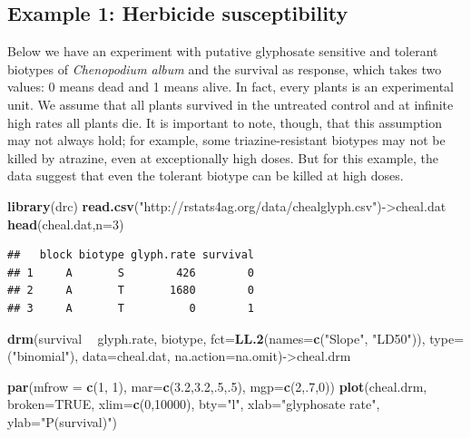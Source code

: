 \documentclass[letterpaper,]{book}
\newenvironment{Shaded}{\begin{snugshade}}{\end{snugshade}}
\newcommand{\DataTypeTok}[1]{\textcolor[rgb]{0.13,0.29,0.53}{#1}}
\newcommand{\DecValTok}[1]{\textcolor[rgb]{0.00,0.00,0.81}{#1}}
\newcommand{\FloatTok}[1]{\textcolor[rgb]{0.00,0.00,0.81}{#1}}
\newcommand{\KeywordTok}[1]{\textcolor[rgb]{0.13,0.29,0.53}{\textbf{#1}}}
\newcommand{\NormalTok}[1]{#1}
\newcommand{\OperatorTok}[1]{\textcolor[rgb]{0.81,0.36,0.00}{\textbf{#1}}}
\newcommand{\OtherTok}[1]{\textcolor[rgb]{0.56,0.35,0.01}{#1}}
\newcommand{\StringTok}[1]{\textcolor[rgb]{0.31,0.60,0.02}{#1}}
\begin{document}
\hypertarget{example-1-herbicide-susceptibility}{%
\subsection{Example 1: Herbicide susceptibility}\label{example-1-herbicide-susceptibility}}

Below we have an experiment with putative glyphosate sensitive and tolerant biotypes of \emph{Chenopodium album} and the survival as response, which takes two values: 0 means dead and 1 means alive. In fact, every plants is an experimental unit. We assume that all plants survived in the untreated control and at infinite high rates all plants die. It is important to note, though, that this assumption may not always hold; for example, some triazine-resistant biotypes may not be killed by atrazine, even at exceptionally high doses. But for this example, the data suggest that even the tolerant biotype can be killed at high doses.



\begin{Shaded}
\begin{Highlighting}[]
\KeywordTok{library}\NormalTok{(drc)}
\KeywordTok{read.csv}\NormalTok{(}\StringTok{"http://rstats4ag.org/data/chealglyph.csv"}\NormalTok{)->cheal.dat}
\KeywordTok{head}\NormalTok{(cheal.dat,}\DataTypeTok{n=}\DecValTok{3}\NormalTok{)}
\end{Highlighting}
\end{Shaded}

\begin{verbatim}
##   block biotype glyph.rate survival
## 1     A       S        426        0
## 2     A       T       1680        0
## 3     A       T          0        1
\end{verbatim}

\begin{Shaded}
\begin{Highlighting}[]
\KeywordTok{drm}\NormalTok{(survival }\OperatorTok{~}\StringTok{ }\NormalTok{glyph.rate, biotype, }\DataTypeTok{fct=}\KeywordTok{LL.2}\NormalTok{(}\DataTypeTok{names=}\KeywordTok{c}\NormalTok{(}\StringTok{"Slope"}\NormalTok{, }\StringTok{"LD50"}\NormalTok{)),}
    \DataTypeTok{type=}\NormalTok{(}\StringTok{"binomial"}\NormalTok{), }\DataTypeTok{data=}\NormalTok{cheal.dat, }\DataTypeTok{na.action=}\NormalTok{na.omit)->cheal.drm}

\KeywordTok{par}\NormalTok{(}\DataTypeTok{mfrow =} \KeywordTok{c}\NormalTok{(}\DecValTok{1}\NormalTok{, }\DecValTok{1}\NormalTok{), }\DataTypeTok{mar=}\KeywordTok{c}\NormalTok{(}\FloatTok{3.2}\NormalTok{,}\FloatTok{3.2}\NormalTok{,.}\DecValTok{5}\NormalTok{,.}\DecValTok{5}\NormalTok{), }\DataTypeTok{mgp=}\KeywordTok{c}\NormalTok{(}\DecValTok{2}\NormalTok{,.}\DecValTok{7}\NormalTok{,}\DecValTok{0}\NormalTok{))}
\KeywordTok{plot}\NormalTok{(cheal.drm, }\DataTypeTok{broken=}\OtherTok{TRUE}\NormalTok{, }\DataTypeTok{xlim=}\KeywordTok{c}\NormalTok{(}\DecValTok{0}\NormalTok{,}\DecValTok{10000}\NormalTok{), }\DataTypeTok{bty=}\StringTok{"l"}\NormalTok{,}
     \DataTypeTok{xlab=}\StringTok{"glyphosate rate"}\NormalTok{, }\DataTypeTok{ylab=}\StringTok{"P(survival)"}\NormalTok{)}
\end{Highlighting}
\end{Shaded}
\end{document}
